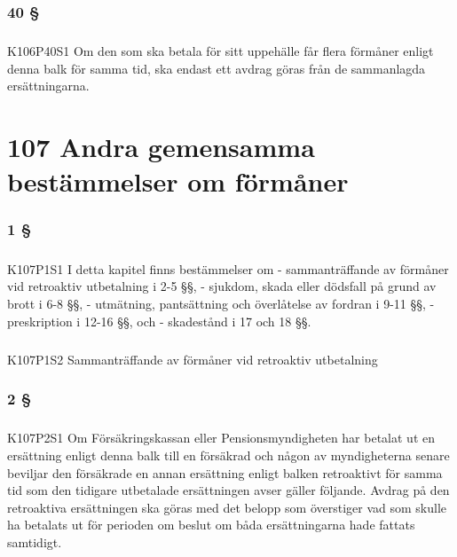 \documentclass[a4paper,notitlepage,openany,10pt]{book}
\begin{document}
\subsection*{40 §}
\paragraph*{}
{\tiny K106P40S1}
Om den som ska betala för sitt uppehälle får flera förmåner enligt denna balk för samma tid, ska endast ett avdrag göras från de sammanlagda ersättningarna.
\chapter*{107 Andra gemensamma bestämmelser om förmåner}
\subsection*{1 §}
\paragraph*{}
{\tiny K107P1S1}
I detta kapitel finns bestämmelser om
\newline - sammanträffande av förmåner vid retroaktiv utbetalning i 2-5 §§,
\newline - sjukdom, skada eller dödsfall på grund av brott i 6-8 §§,
\newline - utmätning, pantsättning och överlåtelse av fordran i 9-11 §§,
\newline - preskription i 12-16 §§, och
\newline - skadestånd i 17 och 18 §§.
\paragraph*{}
{\tiny K107P1S2}
Sammanträffande av förmåner vid retroaktiv utbetalning
\subsection*{2 §}
\paragraph*{}
{\tiny K107P2S1}
Om Försäkringskassan eller Pensionsmyndigheten har betalat ut en ersättning enligt denna balk till en försäkrad och någon av myndigheterna senare beviljar den försäkrade en annan ersättning enligt balken retroaktivt för samma tid som den tidigare utbetalade ersättningen avser gäller följande. Avdrag på den retroaktiva ersättningen ska göras med det belopp som överstiger vad som skulle ha betalats ut för perioden om beslut om båda ersättningarna hade fattats samtidigt.
\end{document}
